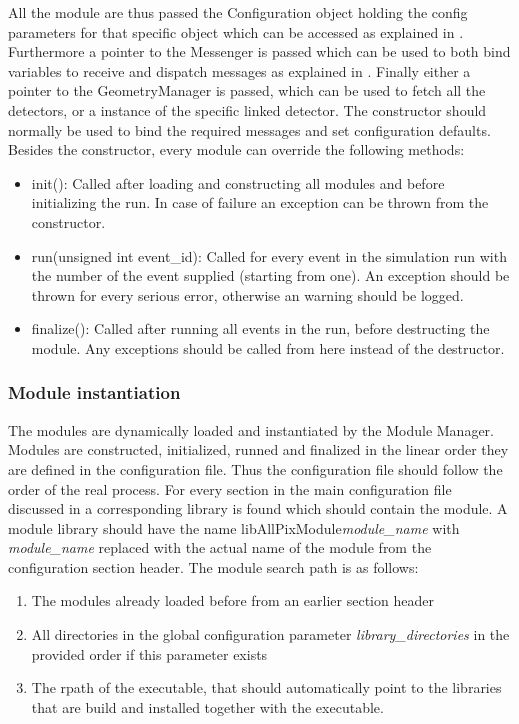 All the module are thus passed the Configuration object holding the config parameters for that specific object which can be accessed as explained in \needref. Furthermore a pointer to the Messenger is passed which can be used to both bind variables to receive and dispatch messages as explained in \needref. Finally either a pointer to the GeometryManager is passed, which can be used to fetch all the detectors, or a instance of the specific linked detector. The constructor should normally be used to bind the required messages and set configuration defaults. Besides the constructor, every module can override the following methods:
\begin{itemize}
\item init(): Called after loading and constructing all modules and before initializing the run. In case of failure an exception can be thrown from the constructor.
\item run(unsigned int event\_id): Called for every event in the simulation run with the number of the event supplied (starting from one). An exception should be thrown for every serious error, otherwise an warning should be logged.
\item finalize(): Called after running all events in the run, before destructing the module. Any exceptions should be called from here instead of the destructor.
\end{itemize}

\subsubsection{Module instantiation}
The modules are dynamically loaded and instantiated by the Module Manager. Modules are constructed, initialized, runned and finalized in the linear order they are defined in the configuration file. Thus the configuration file should follow the order of the real process. For every section in the main configuration file discussed in \needref a corresponding library is found which should contain the module. A module library should have the name libAllPixModule\textit{module\_name} with \textit{module\_name} replaced with the actual name of the module from the configuration section header. The module search path is as follows:
\begin{enumerate}
\item The modules already loaded before from an earlier section header
\item All directories in the global configuration parameter \textit{library\_directories} in the provided order if this parameter exists
\item The rpath of the executable, that should automatically point to the libraries that are build and installed together with the executable.
\end{enumerate}

